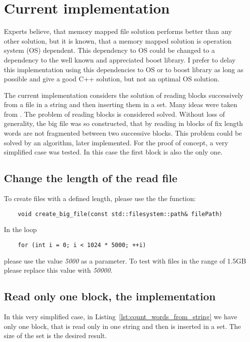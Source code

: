 \documentclass{article}
\begin{document}
\section{Current implementation}

Experts believe, that memory mapped file solution performs better than any other solution, but it is known, that a memory mapped solution is operation system (OS) dependent. This dependency to OS could be changed to a dependency to the well known and appreciated boost library.  I prefer to delay this implementation using this dependencies to OS or to boost library as long as possible and give a good C++ solution, but not an optimal OS solution.  

The current implementation considers the solution of reading blocks successively from a file in a string and then inserting them in a set. Many ideas were taken from \cite{WEBSITE:CppStories, WEBSITE:CppStoriesCSVReader}. The problem of reading blocks is considered solved. Without loss of generality, the big file was so constructed, that by reading in blocks of fix length words are not fragmented between two successive blocks. This problem could be solved by an algorithm, later implemented. For the proof of concept, a very simplified case was tested. In this case the first block is also the only one.

\subsection{Change the length of the read file}

To create files with a defined length, please use the the function: 
\begin{lstlisting}
	void create_big_file(const std::filesystem::path& filePath) 
\end{lstlisting}
In the loop
\begin{lstlisting}
   	for (int i = 0; i < 1024 * 5000; ++i)
\end{lstlisting}
please use the value \textit{5000} as a parameter. To test with files in the range of 1.5GB please replace this value with \textit{50000}.


\subsection{Read only one block, the implementation}

In this very simplified case, in Listing~\ref{lst:count_words_from_string} we have only one block, that is read only in one string and then is inserted in a set. The size of the set is the desired result.
\end{document}
